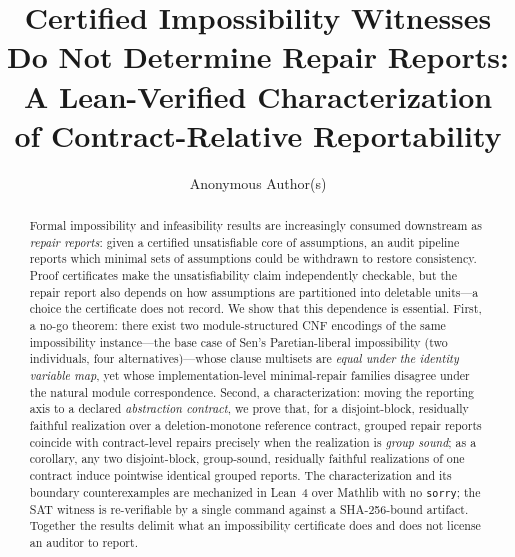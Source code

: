 \documentclass[sigplan,10pt,review,anonymous,nonacm]{acmart}
\theoremstyle{acmdefinition}
\newcommand{\code}[1]{\texttt{#1}}
\begin{document}
\title[Contract-Relative Repair Reports]{Certified Impossibility Witnesses Do Not Determine Repair Reports:
A Lean-Verified Characterization of Contract-Relative Reportability}

\author{Anonymous Author(s)}

\begin{abstract}
Formal impossibility and infeasibility results are increasingly consumed
downstream as \emph{repair reports}: given a certified unsatisfiable core of
assumptions, an audit pipeline reports which minimal sets of assumptions could
be withdrawn to restore consistency.
Proof certificates make the
unsatisfiability claim independently checkable, but the repair report also
depends on how assumptions are partitioned into deletable units---a choice the
certificate does not record.
We show that this dependence is essential. First,
a no-go theorem: there exist two module-structured CNF encodings of the same
impossibility instance---the base case of Sen's Paretian-liberal impossibility
(two individuals, four alternatives)---whose
clause multisets are \emph{equal under the identity variable map}, yet whose
implementation-level minimal-repair families disagree under the natural module
correspondence.
Second, a characterization: moving the reporting axis to a declared
\emph{abstraction contract}, we prove that, for a disjoint-block, residually
faithful realization over a deletion-monotone reference contract, grouped
repair reports coincide with contract-level repairs precisely when the
realization is \emph{group sound}; as a corollary, any two disjoint-block,
group-sound, residually faithful realizations of one contract induce pointwise
identical grouped reports.
The characterization and its boundary
counterexamples are mechanized in Lean~4 over Mathlib with no \code{sorry};
the SAT witness is re-verifiable by a single command against a SHA-256-bound
artifact. Together the results delimit what an impossibility certificate does
and does not license an auditor to report.
\end{abstract}


\maketitle
\end{document}
